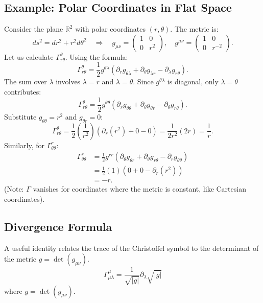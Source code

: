 \documentclass[11pt, a4paper]{report}
\begin{document}
\subsection*{Example: Polar Coordinates in Flat Space}
Consider the plane \(\mathbb{R}^2\) with polar coordinates \((r, \theta)\). The metric is:
\begin{equation}
ds^2 = dr^2 + r^2 d\theta^2 \quad \Longrightarrow \quad g_{\mu\nu} = \begin{pmatrix} 1 & 0 \\ 0 & r^2 \end{pmatrix}, \quad g^{\mu\nu} = \begin{pmatrix} 1 & 0 \\ 0 & r^{-2} \end{pmatrix}.
\end{equation}
Let us calculate \(\Gamma^\theta_{r\theta}\). Using the formula:
\begin{equation}
\Gamma^\theta_{r\theta} = \frac{1}{2} g^{\theta\lambda} ( \partial_r g_{\theta\lambda} + \partial_\theta g_{\lambda r} - \partial_\lambda g_{r\theta} ).
\end{equation}
The sum over \(\lambda\) involves \(\lambda=r\) and \(\lambda=\theta\).
Since \(g^{\theta\lambda}\) is diagonal, only \(\lambda=\theta\) contributes:
\begin{equation}
\Gamma^\theta_{r\theta} = \frac{1}{2} g^{\theta\theta} ( \partial_r g_{\theta\theta} + \partial_\theta g_{\theta r} - \partial_\theta g_{r\theta} ).
\end{equation}
Substitute \(g_{\theta\theta} = r^2\) and \(g_{\theta r} = 0\):
\begin{equation}
\Gamma^\theta_{r\theta} = \frac{1}{2} \left(\frac{1}{r^2}\right) ( \partial_r (r^2) + 0 - 0 ) = \frac{1}{2r^2} (2r) = \frac{1}{r}.
\end{equation}
Similarly, for \(\Gamma^r_{\theta\theta}\):
\begin{align}
\Gamma^r_{\theta\theta} &= \frac{1}{2} g^{rr} ( \partial_\theta g_{\theta r} + \partial_\theta g_{r\theta} - \partial_r g_{\theta\theta} ) \\
&= \frac{1}{2} (1) ( 0 + 0 - \partial_r(r^2) ) \\
&= -r.
\end{align}
(Note: \(\Gamma\) vanishes for coordinates where the metric is constant, like Cartesian coordinates).

\subsection*{Divergence Formula}
A useful identity relates the trace of the Christoffel symbol to the determinant of the metric \(g = \det(g_{\mu\nu})\).
\begin{equation}
    \Gamma^\mu_{\mu\lambda} = \frac{1}{\sqrt{|g|}} \partial_\lambda \sqrt{|g|}
\end{equation}
where $g = \det(g_{\mu\nu})$.
\end{document}
